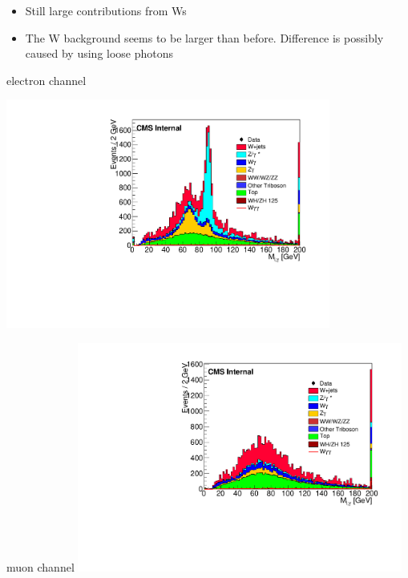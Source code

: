 \documentclass{beamer}
\begin{document}
 {


    \begin{itemize}
        \item Still large contributions from Ws
        \item The W background seems to be larger than before.  Difference is possibly caused by using loose photons
    \end{itemize}

    \bc
     
         electron channel
             
         \includegraphics[width=0.8\textwidth]{Plots/m_lepph_1el2ph.pdf}



         muon channel
        \includegraphics[width=0.8\textwidth]{Plots/m_lepph_1mu2ph.pdf}

    \ec

}
\end{document}
